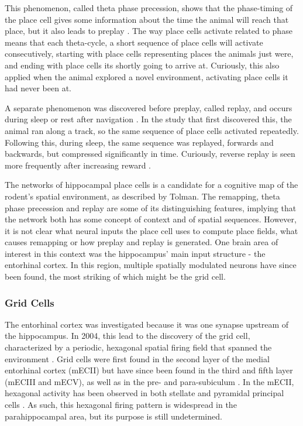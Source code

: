\documentclass{article}
\begin{document}
    This phenomenon, called theta phase precession, shows that the phase-timing of the place cell gives some information about the time the animal will reach that place, but it also leads to preplay \parencite{Dragoi2011,Dragoi2013}. The way place cells activate related to phase means that each theta-cycle, a short sequence of place cells will activate consecutively, starting with place cells representing places the animals just were, and ending with place cells its shortly going to arrive at. Curiously, this also applied when the animal explored a novel environment, activating place cells it had never been at.

    A separate phenomenon was discovered before preplay, called replay, and occurs during sleep or rest after navigation \parencite{Wilson1994,Olafsdottir2016}. In the study that first discovered this, the animal ran along a track, so the same sequence of place cells activated repeatedly. Following this, during sleep, the same sequence was replayed, forwards and backwards, but compressed significantly in time. Curiously, reverse replay is seen more frequently after increasing reward \parencite{Ambrosa2013}.

    The networks of hippocampal place cells is a candidate for a cognitive map of the rodent's spatial environment, as described by Tolman. The remapping, theta phase precession and replay are some of its distinguishing features, implying that the network both has some concept of context and of spatial sequences. However, it is not clear what neural inputs the place cell uses to compute place fields, what causes remapping or how preplay and replay is generated. One brain area of interest in this context was the hippocampus' main input structure - the entorhinal cortex. In this region, multiple spatially modulated neurons have since been found, the most striking of which might be the grid cell.
    
    \subsubsection{Grid Cells} \label{grid cells}
    The entorhinal cortex was investigated because it was one synapse upstream of the hippocampus. In 2004, this lead to the discovery of the grid cell, characterized by a periodic, hexagonal spatial firing field that spanned the environment \parencite{Hafting2005}. Grid cells were first found in the second layer of the medial entorhinal cortex (mECII) but have since been found in the third and fifth layer (mECIII and mECV), as well as in the pre- and para-subiculum \parencite{Boccara2010}. In the mECII, hexagonal activity has been observed in both stellate and pyramidal principal cells \parencite{Rowland2018}. As such, this hexagonal firing pattern is widespread in the parahippocampal area, but its purpose is still undetermined.
    
\end{document}
